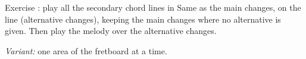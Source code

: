 \begin{study}{Exercise \theexercise: play all the secondary chord lines in \tunekeys}
Same as the main changes, on the  line (alternative changes), keeping the
main changes where no alternative is given. Then play the melody over the
alternative changes.

\smallskip
\keyboxes

\smallskip
\textit{Variant:} one area of the fretboard at a time.
\end{study}
